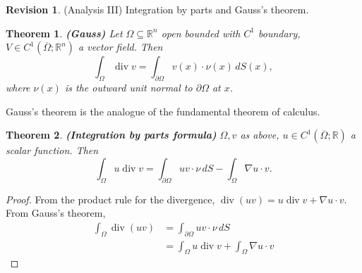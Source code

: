 \documentclass[12pt]{article}
\DeclareMathOperator{\diver}{div}
\newtheorem*{theorem*}{Theorem}
\theoremstyle{definition}
\newtheorem*{revision}{Revision}
\begin{document}
\begin{revision}
(Analysis III) Integration by parts and Gauss's theorem.

\begin{theorem*}
\emph{\textbf{(Gauss)}} Let $\Omega\subseteq\mathbb R^n$ open bounded with $C^1$ boundary, $V\in C^1(\overline\Omega;\mathbb R^n)$ a vector field. Then
\[\int_\Omega\diver v=\int_{\partial\Omega}v(x)\cdot\nu(x)\,dS(x),\]
where $\nu(x)$ is the outward unit normal to $\partial\Omega$ at $x$.
\end{theorem*}

Gauss's theorem is the analogue of the fundamental theorem of calculus.

\begin{theorem*}
\emph{\textbf{(Integration by parts formula)}} $\Omega,v$ as above, $u\in C^1(\overline\Omega;\mathbb R)$ a scalar function. Then
\[\int_\Omega u\diver v=\int_{\partial\Omega}uv\cdot\nu\,dS-\int_\Omega\nabla u\cdot v.\]
\end{theorem*}

\begin{proof}
From the product rule for the divergence, $\diver(uv)=u\diver v+\nabla u\cdot v$. From Gauss's theorem,
\begin{align*}
\int_\Omega\diver(uv)&=\int_{\partial\Omega}uv\cdot\nu\,dS\\
&=\int_\Omega u\diver v+\int_\Omega\nabla u\cdot v
\end{align*}
\end{proof}
\end{revision}
\end{document}
